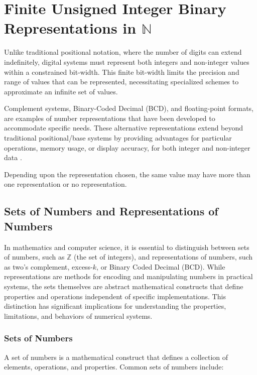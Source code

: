 \chapter{Finite Unsigned Integer Binary Representations in $\mathbb{N}$}
\localtoc
Unlike traditional positional notation, where the number of digits can extend indefinitely, digital systems must represent both integers and non-integer values within a constrained bit-width. This finite bit-width limits the precision and range of values that can be represented, necessitating specialized schemes to approximate an infinite set of values.

Complement systems, Binary-Coded Decimal (BCD), and floating-point formats, are examples of number representations that have been developed to accommodate specific needs. These alternative representations extend beyond traditional positional/base systems by providing advantages for particular operations, memory usage, or display accuracy, for both integer and non-integer data \cite{knuth1997art, rosen2018, tanenbaum2013}. 

Depending upon the representation chosen, the same value may have more than one representation or no representation.

\section{Sets of Numbers and Representations of Numbers}
In mathematics and computer science, it is essential to distinguish between sets of numbers, such as \( \mathbb{Z} \) (the set of integers), and representations of numbers, such as two's complement, excess-\( k \), or Binary Coded Decimal (BCD). While representations are methods for encoding and manipulating numbers in practical systems, the sets themselves are abstract mathematical constructs that define properties and operations independent of specific implementations. This distinction has significant implications for understanding the properties, limitations, and behaviors of numerical systems.

\subsection{Sets of Numbers}
A set of numbers is a mathematical construct that defines a collection of elements, operations, and properties. Common sets of numbers include:

